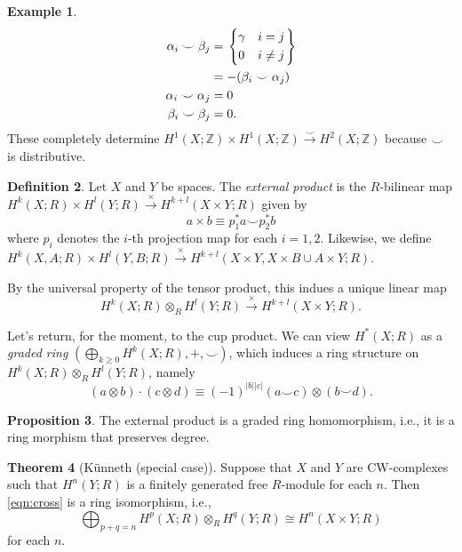 \documentclass[10pt,letterpaper,cm]{nupset}
\theoremstyle{definition}
\newtheorem{definition}{Definition}[subsection]
\newtheorem{exmp}[definition]{Example}
\theoremstyle{theorem}
\newtheorem{theorem}[definition]{Theorem}
\newtheorem{prop}[definition]{Proposition}
\theoremstyle{remark}
\newcommand{\Z}{\mathbb Z}
\newcommand{\1}{\mathbb{1}}
\newcommand{\0}{\vec 0}
\begin{document}
\begin{exmp}
\begin{align*}
  \alpha_i \smile \beta_j & = 
  \begin{rcases}
    \begin{dcases}
   \gamma & i =j \\ 0 & i \ne j  
      \end{dcases}
  \end{rcases}
  \\ &  =  {-}(\beta_i \smile \alpha_j)
 \\  \alpha_i \smile \alpha_j & =0
 \\  \beta_i \smile \beta_j & =0
. \end{align*} These completely determine $H^1(X; \Z) \times H^1(X; \Z) \overset{\smile}{\longrightarrow} H^2(X; \Z)$ because $\smile$ is distributive.
\end{exmp}

\begin{definition}
Let $X$ and $Y$ be spaces. The \textit{external product} is the $R$-bilinear map $H^k(X; R) \times H^l(Y; R) \overset{\times}{\longrightarrow} H^{k+l}(X\times Y; R)$ given by $$ a\times b \equiv p_1^{\ast}{a} \smile p_2^{\ast}{b}$$ where $p_i$ denotes the $i$-th projection map for each $i=1,2$. 
Likewise, we define $H^k(X, A; R) \times H^l(Y, B; R) \overset{\times}{\longrightarrow} H^{k+l}(X\times Y, X\times B \cup A \times Y; R)$.
\end{definition}

By the universal property of the tensor product, this indues a unique linear map  
\[
 \label{eqn:cross}
H^k(X; R) \otimes_R H^l(Y; R) \overset{\times}{\longrightarrow} H^{k+l}(X\times Y; R).\tag{$\ast$}
\]

\smallskip

Let's return, for the moment, to the cup product. We can view $H^{\ast}(X; R)$ as a \textit{graded ring} $\left(\bigoplus_{k\geq 0} H^k(X; R), +, \smile\right)$, which induces a ring structure on $H^k(X; R) \otimes_R H^l(Y; R)$, namely
\[
\left(a \otimes b\right)\cdot \left(c \otimes d\right) \equiv ({-1})^{\left\lvert{b}\right\rvert \left\lvert{c}\right\rvert}\left(a \smile c\right) \otimes \left(b\smile d\right).
\]

\begin{prop}
The external product is a graded ring homomorphism, i.e., it is a ring morphism that preserves degree.
\end{prop}



\begin{theorem}[K\"unneth (special case)]\label{kunneth}
Suppose that  $X$ and $Y$ are CW-complexes such that $H^n(Y; R)$ is a finitely generated free $R$-module for each $n$. Then \eqref{eqn:cross} is a ring isomorphism, i.e.,  $$\bigoplus_{p+q= n} H^p(X; R) \otimes_R H^q(Y; R) \cong H^n(X\times Y; R)$$ for each $n$. 
\end{theorem}
\end{document}
